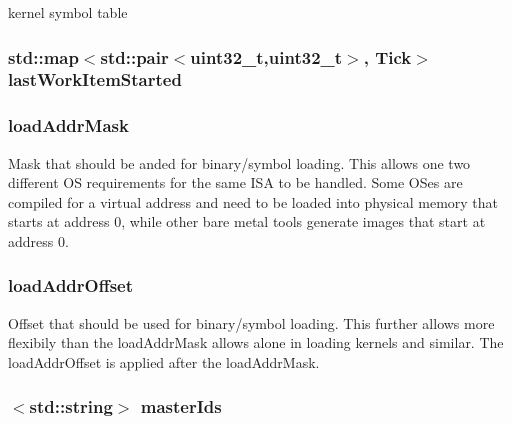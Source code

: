 \label{classSystem_a579bef006c1d6148c2764355c0b039b7}
kernel symbol table \hypertarget{classSystem_a465e763cb54f007726f9b8c35e6638b3}{
\subsubsection[{lastWorkItemStarted}]{\setlength{\rightskip}{0pt plus 5cm}std::map$<${\bf std::pair}$<${\bf uint32\_\-t},{\bf uint32\_\-t}$>$, {\bf Tick}$>$ {\bf lastWorkItemStarted}}}
\label{classSystem_a465e763cb54f007726f9b8c35e6638b3}
\hypertarget{classSystem_a49e011922eb3cd15a03e61e206bf02d3}{
\subsubsection[{loadAddrMask}]{ {\bf loadAddrMask}}}
\label{classSystem_a49e011922eb3cd15a03e61e206bf02d3}
Mask that should be anded for binary/symbol loading. This allows one two different OS requirements for the same ISA to be handled. Some OSes are compiled for a virtual address and need to be loaded into physical memory that starts at address 0, while other bare metal tools generate images that start at address 0. \hypertarget{classSystem_a23e95dade560d359d40e4e98456279ad}{
\subsubsection[{loadAddrOffset}]{ {\bf loadAddrOffset}}}
\label{classSystem_a23e95dade560d359d40e4e98456279ad}
Offset that should be used for binary/symbol loading. This further allows more flexibily than the loadAddrMask allows alone in loading kernels and similar. The loadAddrOffset is applied after the loadAddrMask. \hypertarget{classSystem_af29dc1c2c4242f28c6934043af159765}{
\subsubsection[{masterIds}]{$<$std::string$>$ {\bf masterIds}}}

